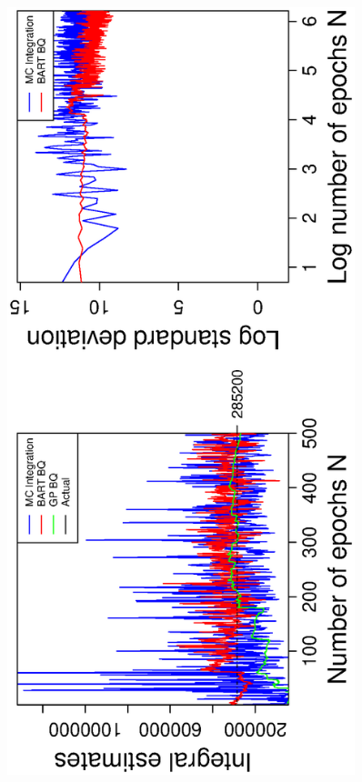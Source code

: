 \vspace{-0.5cm}
\begin{figure}[H]
  \centering
  \hspace{-1.6cm}
  \begin{minipage}[b]{0.4\textwidth}
    \includegraphics[width = 0.9\textwidth, angle = -90]{report/Figures/6/convergenceMean63Dimensions.eps}

\end{minipage}
\end{figure}
